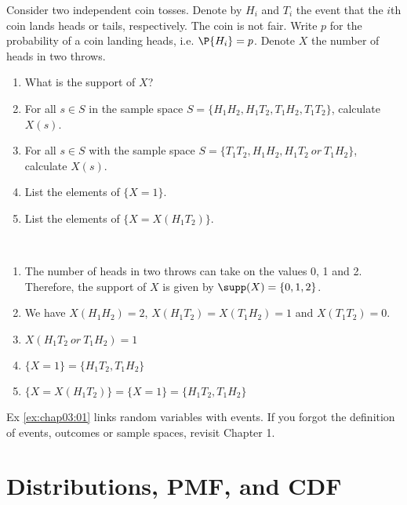 \begin{exercise}\label{ex:chap03:01}
	Consider two independent coin tosses. Denote by $H_i$ and $T_i$ the event that the $i$th coin lands heads or tails, respectively. The coin is not fair. Write $p$ for the probability of a coin landing heads, i.e. $\P{H_i} = p$. Denote $X$ the number of heads in two throws.
	\begin{enumerate}
		\item What is the support of $X$?
		\item For all $s \in S$ in the sample space $S = \{H_1H_2, H_1T_2, T_1H_2, T_1T_2\}$, calculate $X(s)$.
		\item  For all $s\in S$ with the sample space $S=\{T_1T_2, H_1H_2, H_1T_2 ~\textit{or}~ T_1H_2\}$, calculate $X(s)$.
		\item List the elements of $\{X = 1\}$.
		\item List the elements of $\{X =X(H_1T_2) \}$.
	\end{enumerate}
		
	\begin{solution}~
		\begin{enumerate}
			\item The number of heads in two throws can take on the values 0, 1 and 2. Therefore, the support of $X$ is given by $\supp(X) = \{0,1,2\}$.	
			\item We have $X(H_1H_2) = 2$, $X(H_1T_2) = X(T_1H_2) = 1$ and $X(T_1T_2) = 0$.
			\item $X(H_1T_2 ~\textit{or}~ T_1H_2) = 1$
			\item $\{X = 1\} = \{H_1 T_2, T_1 H_2\}$
			\item $\{X = X(H_1 T_2)\} = \{X = 1\} = \{H_1 T_2, T_1 H_2\}$
		\end{enumerate}
	\end{solution}
\end{exercise}
	 
\begin{remark}
	Ex \ref{ex:chap03:01} links random variables with events. If you forgot the definition of events, outcomes or sample spaces, revisit Chapter 1.
\end{remark}
	
\section{Distributions, PMF, and CDF}
\label{sec:section-3.2}
	

